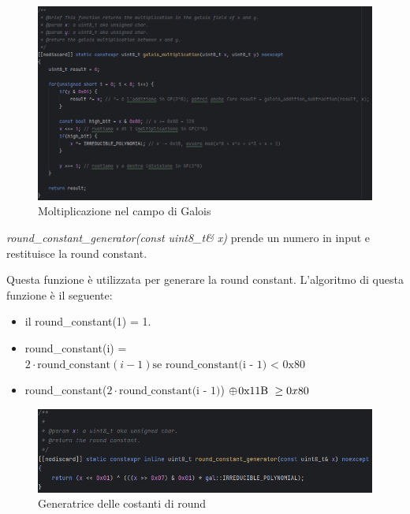 \begin{figure}[H]
	\centering
	\includegraphics[width=1\textwidth, height=1\textheight, keepaspectratio]{./images/code/cpp/galois_math/galois_multiplication.PNG}
	\caption{Moltiplicazione nel campo di Galois}
	\label{fig:galois_multiplication}
\end{figure}

\textsf{\small \emph{round\_constant\_generator(const uint8\_t\& x)} prende un numero in input e restituisce la round constant.} %

\textsf{\small Questa funzione è utilizzata per generare la round constant.}
\textsf{\small L'algoritmo di questa funzione è il seguente: }

\begin{itemize}
	\item \textsf{\small il round\_constant(1) = 1.}
	\item \textsf{\small round\_constant(i) = $2 \cdot \text{round\_constant}(i - 1) \text{se round\_constant(i - 1) < 0x80}$}
	\item \textsf{\small round\_constant($2 \cdot \text{round\_constant(i - 1)}$) $ \oplus \hspace{0.3mm} \text{0x11B } \ge 0x80$ }
\end{itemize}

\begin{figure}[H] %
	\centering
	\includegraphics[width=1\textwidth, height=1\textheight, keepaspectratio]{./images/code/cpp/galois_math/round_constant_generator.PNG}
	\caption{Generatrice delle costanti di round}
	\label{fig:round_constant_generator}
\end{figure}

